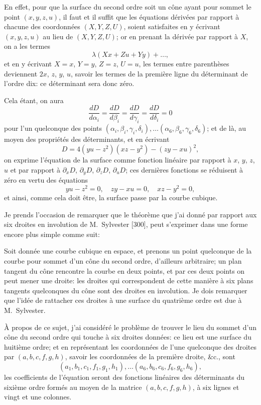 \documentclass[11pt,a4paper]{article}
\begin{document}
En effet, pour que la surface du second ordre soit un c\^{o}ne ayant pour sommet le point $(x, y, z, u)$, il faut et il suffit que les \'{e}quations d\'{e}riv\'{e}es par rapport \`{a} chacune des coordonn\'{e}es $(X, Y, Z, U)$, soient satisfaites en y \'{e}crivant $(x, y, z, u)$ au lieu de $(X, Y, Z, U)$; or en prenant la d\'{e}riv\'{e}e par rapport \`{a} $X$, on a les termes
\[
\lambda(Xx + Zu + Yy) + \ldots,
\]
et en y \'{e}crivant $X = x$, $Y = y$, $Z = z$, $U = u$, les termes entre parenth\`{e}ses deviennent $2x$, $z$, $y$, $u$, savoir les termes de la premi\`{e}re ligne du d\'{e}terminant de l'ordre dix: ce d\'{e}terminant sera donc z\'{e}ro.

Cela \'{e}tant, on aura
\[
\frac{dD}{d\alpha_i} = \frac{dD}{d\beta_i} = \frac{dD}{d\gamma_i} = \frac{dD}{d\delta_i} = 0
\]
pour l'un quelconque des points $(\alpha_i, \beta_i, \gamma_i, \delta_i), \ldots (\alpha_6, \beta_6, \gamma_6, \delta_6)$; et de l\`{a}, au moyen des propri\'{e}t\'{e}s des d\'{e}terminants, et en \'{e}crivant
\[
D = 4(yu - z^2)(xz - y^2) - (zy - xu)^2,
\]
on exprime l'\'{e}quation de la surface comme fonction lin\'{e}aire par rapport \`{a} $x$, $y$, $z$, $u$ et par rapport \`{a} $\partial_x D$, $\partial_y D$, $\partial_z D$, $\partial_u D$; ces derni\`{e}res fonctions se r\'{e}duisent \`{a} z\'{e}ro en vertu des \'{e}quations
\[
yu - z^2 = 0, \quad zy - xu = 0, \quad xz - y^2 = 0,
\]
et ainsi, comme cela doit \^{e}tre, la surface passe par la courbe cubique.

Je prends l'occasion de remarquer que le th\'{e}or\`{e}me que j'ai donn\'{e} par rapport aux six droites en involution de M.~Sylvester [300], peut s'exprimer dans une forme encore plus simple comme suit:

Soit donn\'{e}e une courbe cubique en espace, et prenons un point quelconque de la courbe pour sommet d'un c\^{o}ne du second ordre, d'ailleurs arbitraire; un plan tangent du c\^{o}ne rencontre la courbe en deux points, et par ces deux points on peut mener une droite: les droites qui correspondent de cette mani\`{e}re \`{a} six plans tangents quelconques du c\^{o}ne sont des droites en involution. Je dois remarquer que l'id\'{e}e de rattacher ces droites \`{a} une surface du quatri\`{e}me ordre est due \`{a} M.~Sylvester.

\`{A} propos de ce sujet, j'ai consid\'{e}r\'{e} le probl\`{e}me de trouver le lieu du sommet d'un c\^{o}ne du second ordre qui touche \`{a} six droites donn\'{e}es: ce lieu est une surface du huiti\`{e}me ordre; et en repr\'{e}sentant les coordonn\'{e}es de l'une quelconque des droites par $(a, b, c, f, g, h)$, savoir les coordonn\'{e}es de la premi\`{e}re droite, \&c., sont
\[
(a_1, b_1, c_1, f_1, g_1, h_1), \ldots (a_6, b_6, c_6, f_6, g_6, h_6),
\]
les coefficients de l'\'{e}quation seront des fonctions lin\'{e}aires des d\'{e}terminants du sixi\`{e}me ordre form\'{e}s au moyen de la matrice $(a, b, c, f, g, h)$, \`{a} six lignes et vingt et une colonnes.
\end{document}
